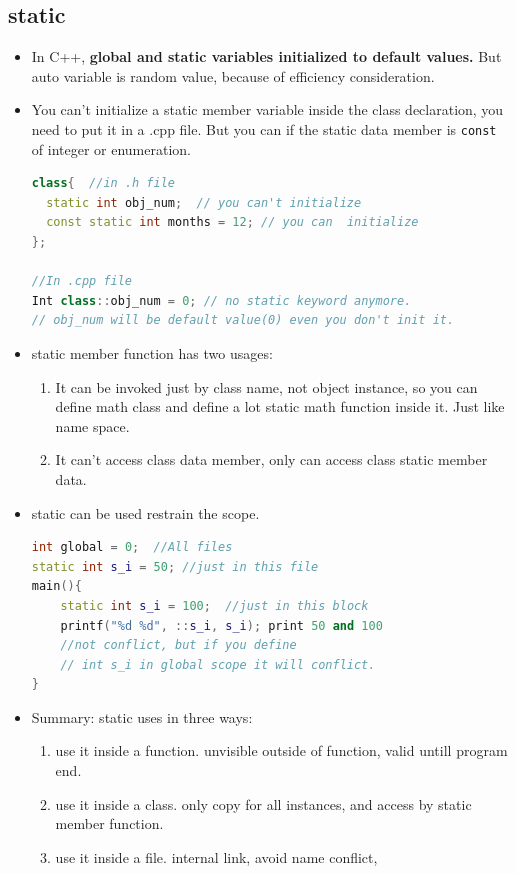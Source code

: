\documentclass[a4paper,12pt,twoside]{book}
\begin{document}
\subsection{static}
\begin{itemize}

\item In C++, \textbf{global and static variables initialized to default values.}  But auto variable is random value, because of efficiency consideration.

\item You can't initialize a static member variable inside the class declaration, you need to put it in a .cpp file.   But you can if the static data member is \texttt{const} of integer or enumeration.
\begin{lstlisting}[frame=single, language=c++]
class{  //in .h file
  static int obj_num;  // you can't initialize
  const static int months = 12; // you can  initialize
};

//In .cpp file
Int class::obj_num = 0; // no static keyword anymore.
// obj_num will be default value(0) even you don't init it.
\end{lstlisting}

\item static member function has two usages:
\begin{enumerate}
\item It can be invoked just by class name, not object instance, so you can define math class and define a lot static math function inside it.  Just like name space.
\item It can't access class data member, only can access class static member data.
\end{enumerate}

\item static can be used restrain the scope.
\begin{lstlisting}[frame=single, language=c++]
int global = 0;  //All files
static int s_i = 50; //just in this file
main(){
    static int s_i = 100;  //just in this block
    printf("%d %d", ::s_i, s_i); print 50 and 100
    //not conflict, but if you define 
    // int s_i in global scope it will conflict. 
}
\end{lstlisting}

\item Summary: static uses in three ways:
\begin{enumerate}
\item use it inside a function. unvisible outside of function, valid untill program end.
\item use it inside a class. only copy for all instances, and access by static member function.
\item use it inside a file. internal link, avoid name conflict, 
\end{enumerate}

\end{itemize}
\end{document}
